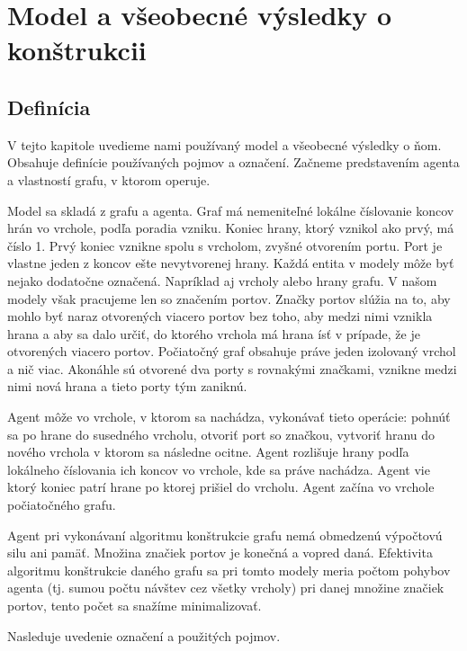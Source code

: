 {}
\chapter{Model a všeobecné výsledky o konštrukcii}\label{chap:intro}

\section{Definícia}
V tejto kapitole uvedieme nami používaný model a všeobecné výsledky o ňom.
Obsahuje definície používaných pojmov a označení. Začneme predstavením
agenta a vlastností grafu, v ktorom operuje.

\begin{defin}
Model sa skladá z grafu a agenta. Graf má nemeniteľné lokálne číslovanie koncov hrán vo
vrchole, podľa poradia vzniku. Koniec hrany, ktorý vznikol ako prvý, má
číslo 1. 
Prvý koniec vznikne spolu s vrcholom, zvyšné otvorením portu. Port je
vlastne jeden z koncov ešte nevytvorenej hrany. Každá entita v modely môže
byť nejako dodatočne označená. Napríklad aj vrcholy alebo hrany grafu. V
našom modely však pracujeme len so značením portov. Značky portov slúžia na
to, aby mohlo byť naraz otvorených viacero portov bez toho, aby medzi nimi
vznikla hrana a aby sa dalo určiť, do ktorého vrchola má hrana ísť v
prípade, že je otvorených viacero portov.
Počiatočný graf obsahuje práve jeden izolovaný vrchol a nič viac. Akonáhle
sú otvorené dva porty s rovnakými značkami, vznikne medzi nimi nová hrana a
tieto porty tým zaniknú.

Agent môže vo vrchole, v ktorom sa nachádza, vykonávať tieto operácie: pohnúť sa po hrane do susedného
vrcholu, otvoriť port so značkou, vytvoriť hranu do nového vrchola v ktorom sa následne
ocitne. Agent rozlišuje hrany podľa lokálneho číslovania ich koncov vo
vrchole, kde sa práve nachádza. Agent vie ktorý koniec patrí hrane po ktorej
prišiel do vrcholu. Agent začína vo vrchole počiatočného grafu.

Agent pri vykonávaní algoritmu konštrukcie grafu nemá obmedzenú výpočtovú
silu ani pamäť. Množina značiek portov je konečná a vopred daná. Efektivita
algoritmu konštrukcie daného grafu sa pri tomto modely meria počtom pohybov
agenta (tj. sumou počtu návštev cez všetky vrcholy) pri danej množine značiek
portov, tento počet sa snažíme minimalizovať.
\end{defin}

Nasleduje uvedenie označení a použitých pojmov.

